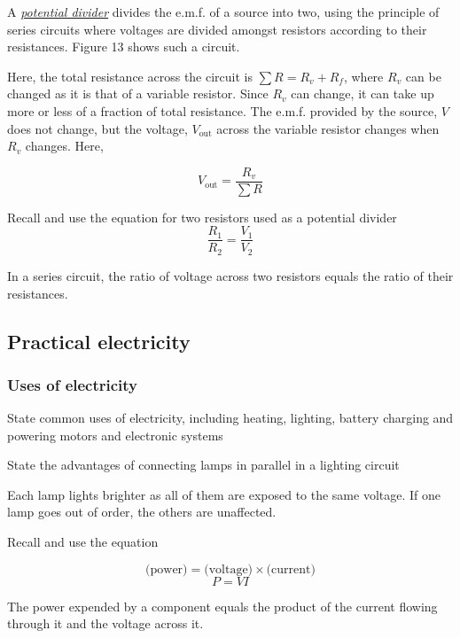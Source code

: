 A \ul{\emph{potential divider}} divides the e.m.f. of a source into two, using the principle of series 
circuits where voltages are divided amongst resistors according to their resistances. Figure 13
shows such a circuit.

Here, the total resistance across the circuit is $\sum{R} = R_v + R_f$, where $R_v$ can be changed as it
is that of a variable resistor. Since $R_v$ can change, it can take up more or less of a fraction
of total resistance. The e.m.f. provided by the source, $V$ does not change, but the voltage,
$ V_\textrm{out}$ across the variable resistor changes when $R_v$ changes. Here,

$$ V_\textrm{out} = \frac{R_v}{\sum{R}} $$

\begin{subpoint}
Recall and use the equation for two resistors used as a potential divider
$$ \frac{R_1}{R_2} = \frac{V_1}{V_2} $$
\end{subpoint}

In a series circuit, the ratio of voltage across two resistors equals the ratio of their
resistances.

\subsection{Practical electricity}
\subsubsection{Uses of electricity}

\begin{subpoint}
State common uses of electricity, including heating, lighting, battery charging and powering motors and 
electronic systems
\end{subpoint}

\begin{subpoint}
State the advantages of connecting lamps in parallel in a lighting circuit
\end{subpoint}

Each lamp lights brighter as all of them are exposed to the same voltage. If one lamp goes out
of order, the others are unaffected.

\begin{subpoint}
Recall and use the equation

$$ \textrm{(power)} = \textrm{(voltage)} \times \textrm{(current)} $$
$$ P = VI $$
\end{subpoint}

The power expended by a component equals the product of the current flowing through it and the
voltage across it.

